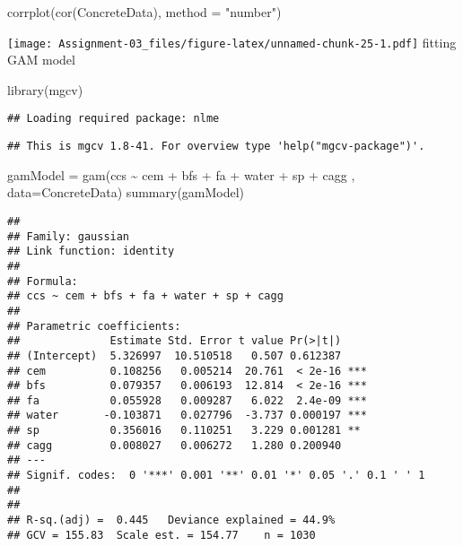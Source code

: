\documentclass[
]{article}
\newenvironment{Shaded}{\begin{snugshade}}{\end{snugshade}}
\newcommand{\AttributeTok}[1]{\textcolor[rgb]{0.77,0.63,0.00}{#1}}
\newcommand{\FunctionTok}[1]{\textcolor[rgb]{0.00,0.00,0.00}{#1}}
\newcommand{\NormalTok}[1]{#1}
\newcommand{\OtherTok}[1]{\textcolor[rgb]{0.56,0.35,0.01}{#1}}
\newcommand{\SpecialCharTok}[1]{\textcolor[rgb]{0.00,0.00,0.00}{#1}}
\newcommand{\StringTok}[1]{\textcolor[rgb]{0.31,0.60,0.02}{#1}}
\begin{document}
\begin{Shaded}
\begin{Highlighting}[]
\FunctionTok{corrplot}\NormalTok{(}\FunctionTok{cor}\NormalTok{(ConcreteData), }\AttributeTok{method =} \StringTok{"number"}\NormalTok{)}
\end{Highlighting}
\end{Shaded}

\texttt{[image: Assignment-03\_files/figure-latex/unnamed-chunk-25-1.pdf]}
fitting GAM model

\begin{Shaded}
\begin{Highlighting}[]
\FunctionTok{library}\NormalTok{(mgcv)}
\end{Highlighting}
\end{Shaded}

\begin{verbatim}
## Loading required package: nlme
\end{verbatim}

\begin{verbatim}
## This is mgcv 1.8-41. For overview type 'help("mgcv-package")'.
\end{verbatim}

\begin{Shaded}
\begin{Highlighting}[]
\NormalTok{gamModel }\OtherTok{=} \FunctionTok{gam}\NormalTok{(ccs }\SpecialCharTok{\textasciitilde{}}\NormalTok{ cem }\SpecialCharTok{+}\NormalTok{ bfs }\SpecialCharTok{+}\NormalTok{ fa }\SpecialCharTok{+}\NormalTok{ water }\SpecialCharTok{+}\NormalTok{ sp }\SpecialCharTok{+}\NormalTok{ cagg , }\AttributeTok{data=}\NormalTok{ConcreteData)}
\FunctionTok{summary}\NormalTok{(gamModel)}
\end{Highlighting}
\end{Shaded}

\begin{verbatim}
## 
## Family: gaussian 
## Link function: identity 
## 
## Formula:
## ccs ~ cem + bfs + fa + water + sp + cagg
## 
## Parametric coefficients:
##              Estimate Std. Error t value Pr(>|t|)    
## (Intercept)  5.326997  10.510518   0.507 0.612387    
## cem          0.108256   0.005214  20.761  < 2e-16 ***
## bfs          0.079357   0.006193  12.814  < 2e-16 ***
## fa           0.055928   0.009287   6.022  2.4e-09 ***
## water       -0.103871   0.027796  -3.737 0.000197 ***
## sp           0.356016   0.110251   3.229 0.001281 ** 
## cagg         0.008027   0.006272   1.280 0.200940    
## ---
## Signif. codes:  0 '***' 0.001 '**' 0.01 '*' 0.05 '.' 0.1 ' ' 1
## 
## 
## R-sq.(adj) =  0.445   Deviance explained = 44.9%
## GCV = 155.83  Scale est. = 154.77    n = 1030
\end{verbatim}
\end{document}
